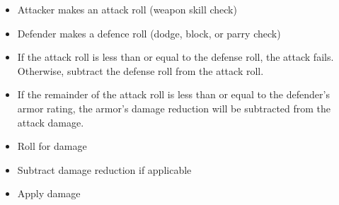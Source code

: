 
\begin{itemize}
    \item Attacker makes an attack roll (weapon skill check)
    \item Defender makes a defence roll (dodge, block, or parry check)
    \item If the attack roll is less than or equal to the defense roll, the
            attack fails. Otherwise, subtract the defense roll from the
            attack roll.
    \item If the remainder of the attack roll is less than or equal to the
            defender's armor rating, the armor's damage reduction will be
            subtracted from the attack damage.
    \item Roll for damage
    \item Subtract damage reduction if applicable
    \item Apply damage
\end{itemize}
